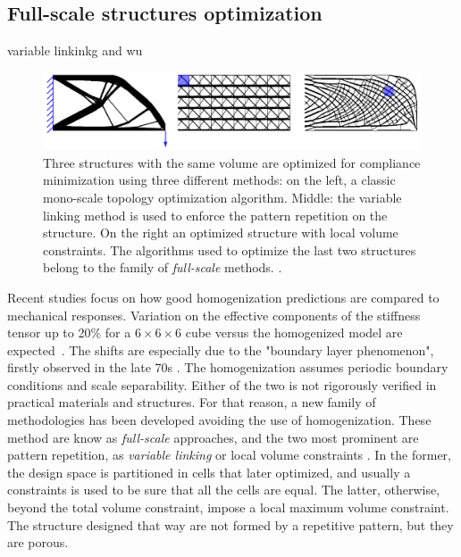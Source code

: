\subsection{Full-scale structures optimization}
variable linkinkg and wu

\begin{figure}
    \centering
    \includegraphics[width=0.7\linewidth]{figures/02_literature/full-to.png}
    \caption{Three structures with the same volume are optimized for compliance minimization using three different methods: on the left, a classic mono-scale topology optimization algorithm. Middle: the variable linking method is used to enforce the pattern repetition on the structure. On the right an optimized structure with local volume constraints. The algorithms used to optimize the last two structures belong to the family of \textit{full-scale} methods. \cite{wu_topology_2021}.}
    \label{fig:02_full-to}
\end{figure}

Recent studies focus on how good homogenization predictions are compared to mechanical responses. Variation on the effective components of the stiffness tensor up to 20\% for a $6\times6\times6$ cube versus the homogenized model are expected~. The shifts are especially due to the "boundary layer phenomenon", firstly observed in the late 70s . The homogenization assumes periodic boundary conditions and scale separability. Either of the two is not rigorously verified in practical materials and structures. For that reason, a new family of methodologies has been developed avoiding the use of homogenization. These method are know as \textit{full-scale} approaches, and the two most prominent  are pattern repetition, as \textit{variable linking}  or local volume constraints . In the former, the design space is partitioned in cells that later optimized, and usually a constraints is used to be sure that all the cells are equal. The latter, otherwise, beyond the total volume constraint, impose a local maximum volume constraint. The structure designed that way are not formed by a repetitive pattern, but they are porous.

